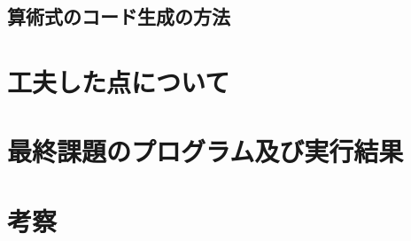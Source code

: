 \subsection{算術式のコード生成の方法}


\section{工夫した点について}


\section{最終課題のプログラム及び実行結果}


\section{考察}








